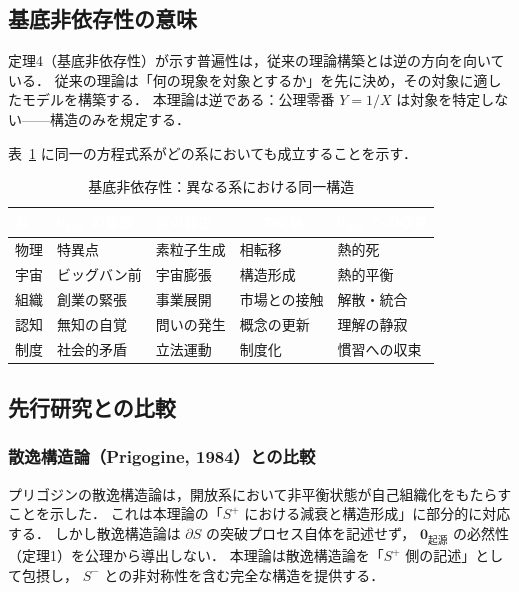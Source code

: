 \documentclass[12pt, a4paper]{article}
\theoremstyle{definition}
\newcommand{\vorigin}{\mathbf{0}_{\text{起源}}}
\newcommand{\vequil}{\mathbf{0}_{\text{平衡}}}
\begin{document}
\subsection{基底非依存性の意味}

定理4（基底非依存性）が示す普遍性は，従来の理論構築とは逆の方向を向いている．
従来の理論は「何の現象を対象とするか」を先に決め，その対象に適したモデルを構築する．
本理論は逆である：公理零番 $Y = 1/X$ は対象を特定しない——構造のみを規定する．

表~\ref{tab:universality} に同一の方程式系がどの系においても成立することを示す．

\begin{table}[h!]
  \centering
  \caption{基底非依存性：異なる系における同一構造}
  \vspace{0.3em}
  \renewcommand{\arraystretch}{1.3}
  \begin{tabularx}{\textwidth}{lXXXX}
    \toprule
    \rowcolor{headerblue}
    \textcolor{white}{\textbf{系}} &
    \textcolor{white}{\textbf{$\vorigin$ の緊張}} &
    \textcolor{white}{\textbf{波の発生}} &
    \textcolor{white}{\textbf{$\partial S$ の突破}} &
    \textcolor{white}{\textbf{$\vequil$ への収束}} \\
    \midrule
    物理   & 特異点     & 素粒子生成   & 相転移       & 熱的死 \\
    宇宙   & ビッグバン前 & 宇宙膨張   & 構造形成     & 熱的平衡 \\
    組織   & 創業の緊張 & 事業展開     & 市場との接触 & 解散・統合 \\
    認知   & 無知の自覚 & 問いの発生   & 概念の更新   & 理解の静寂 \\
    制度   & 社会的矛盾 & 立法運動     & 制度化       & 慣習への収束 \\
    \bottomrule
  \end{tabularx}
  \label{tab:universality}
\end{table}

\subsection{先行研究との比較}

\subsubsection{散逸構造論（Prigogine, 1984）との比較}

プリゴジンの散逸構造論は，開放系において非平衡状態が自己組織化をもたらすことを示した．
これは本理論の「$S^+$ における減衰と構造形成」に部分的に対応する．
しかし散逸構造論は $\partial S$ の突破プロセス自体を記述せず，
$\vorigin$ の必然性（定理1）を公理から導出しない．
本理論は散逸構造論を「$S^+$ 側の記述」として包摂し，
$S^-$ との非対称性を含む完全な構造を提供する．
\end{document}
